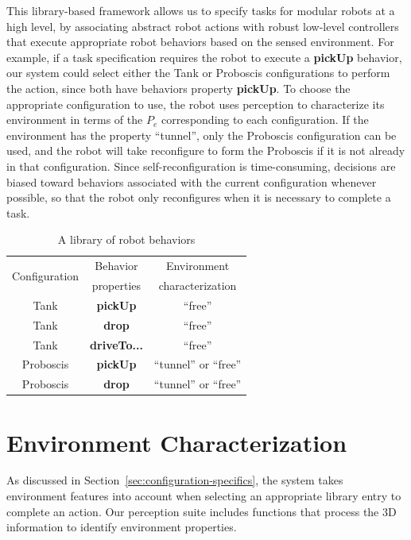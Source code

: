 \documentclass[conference]{IEEEtran}
\begin{document}
This library-based framework allows us to specify tasks for modular robots at a high level, by associating abstract robot actions with robust low-level controllers that execute appropriate robot behaviors based on the sensed environment. For example, if a task specification requires the robot to execute a \textbf{pickUp} behavior, our system could select either the Tank or Proboscis configurations to perform the action, since both have behaviors property \textbf{pickUp}. To choose the appropriate configuration to use, the robot uses perception to characterize its environment in terms of the $P_e$ corresponding to each configuration. If the environment has the property ``tunnel'', only the Proboscis configuration can be used, and the robot will take  reconfigure to form the Proboscis if it is not already in that configuration. Since self-reconfiguration is time-consuming, decisions are biased toward behaviors associated with the current configuration whenever possible, so that the robot only reconfigures when it is necessary to complete a task.
%
\begin{table}
\centering
\begin{tabular}{ |c|c|c| } 
 \hline
 \multirow{2}{6em}{Configuration} & Behavior & Environment \\
 & properties & characterization \\
 \hline
 Tank & \textbf{pickUp} & ``free'' \\\hline
 Tank & \textbf{drop} & ``free'' \\\hline
 Tank & \textbf{driveTo...} & ``free''\\ \hline
 Proboscis & \textbf{pickUp} & ``tunnel'' or ``free''\\ \hline
 Proboscis & \textbf{drop} &``tunnel'' or ``free'' \\ 
 \hline
\end{tabular}
\caption{A library of robot behaviors}
\label{table:1}
\vspace{-1em}
\end{table}

%
%

\section{Environment Characterization}
\label{sec:environment-characterization}
%
As discussed in Section~\ref{sec:configuration-specifics}, the system takes environment features into account when selecting an appropriate library entry to complete an action. Our perception suite includes functions that process the 3D information to identify environment properties.
\end{document}
